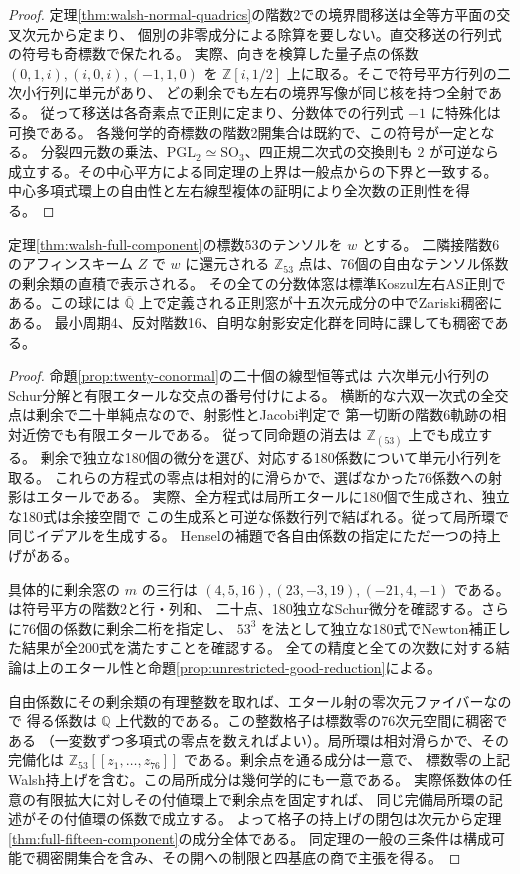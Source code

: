 \begin{proof}
定理\ref{thm:walsh-normal-quadrics}の階数2での境界間移送は全等方平面の交叉次元から定まり、
個別の非零成分による除算を要しない。直交移送の行列式の符号も奇標数で保たれる。
実際、向きを検算した量子点の係数 $(0,1,i),(i,0,i),(-1,1,0)$ を
$\mathbb Z[i,1/2]$ 上に取る。そこで符号平方行列の二次小行列に単元があり、
どの剰余でも左右の境界写像が同じ核を持つ全射である。
従って移送は各奇素点で正則に定まり、分数体での行列式 $-1$ に特殊化は可換である。
各幾何学的奇標数の階数2開集合は既約で、この符号が一定となる。
分裂四元数の乗法、$\mathrm{PGL}_2\simeq\mathrm{SO}_3$、四正規二次式の交換則も
$2$ が可逆なら成立する。その中心平方による同定理の上界は一般点からの下界と一致する。
中心多項式環上の自由性と左右線型複体の証明により全次数の正則性を得る。
\end{proof}

\begin{theorem}\label{thm:regular-53-adic-ball}
定理\ref{thm:walsh-full-component}の標数53のテンソルを $w$ とする。
二隣接階数6のアフィンスキーム $Z$ で $w$ に還元される
$\mathbb Z_{53}$ 点は、76個の自由なテンソル係数の剰余類の直積で表示される。
その全ての分数体窓は標準Koszul左右AS正則である。この球には
$\overline{\mathbb Q}$ 上で定義される正則窓が十五次元成分の中でZariski稠密にある。
最小周期4、反対階数16、自明な射影安定化群を同時に課しても稠密である。
\end{theorem}
\begin{proof}
命題\ref{prop:twenty-conormal}の二十個の線型恒等式は
六次単元小行列のSchur分解と有限エタールな交点の番号付けによる。
横断的な六双一次式の全交点は剰余で二十単純点なので、射影性とJacobi判定で
第一切断の階数6軌跡の相対近傍でも有限エタールである。
従って同命題の消去は $\mathbb Z_{(53)}$ 上でも成立する。
剰余で独立な180個の微分を選び、対応する180係数について単元小行列を取る。
これらの方程式の零点は相対的に滑らかで、選ばなかった76係数への射影はエタールである。
実際、全方程式は局所エタールに180個で生成され、独立な180式は余接空間で
この生成系と可逆な係数行列で結ばれる。従って局所環で同じイデアルを生成する。
Henselの補題で各自由係数の指定にただ一つの持上げがある。

具体的に剰余窓の $m$ の三行は $(4,5,16),(23,-3,19),(-21,4,-1)$ である。
 は符号平方の階数2と行・列和、
二十点、180独立なSchur微分を確認する。さらに76個の係数に剰余二桁を指定し、
$53^3$ を法として独立な180式でNewton補正した結果が全200式を満たすことを確認する。
全ての精度と全ての次数に対する結論は上のエタール性と命題\ref{prop:unrestricted-good-reduction}による。

自由係数にその剰余類の有理整数を取れば、エタール射の零次元ファイバーなので
得る係数は $\mathbb Q$ 上代数的である。この整数格子は標数零の76次元空間に稠密である
（一変数ずつ多項式の零点を数えればよい）。局所環は相対滑らかで、その完備化は
$\mathbb Z_{53}[[z_1,\ldots,z_{76}]]$ である。剰余点を通る成分は一意で、
標数零の上記Walsh持上げを含む。この局所成分は幾何学的にも一意である。
実際係数体の任意の有限拡大に対しその付値環上で剰余点を固定すれば、
同じ完備局所環の記述がその付値環の係数で成立する。
よって格子の持上げの閉包は次元から定理\ref{thm:full-fifteen-component}の成分全体である。
同定理の一般の三条件は構成可能で稠密開集合を含み、その開への制限と四基底の商で主張を得る。
\end{proof}

